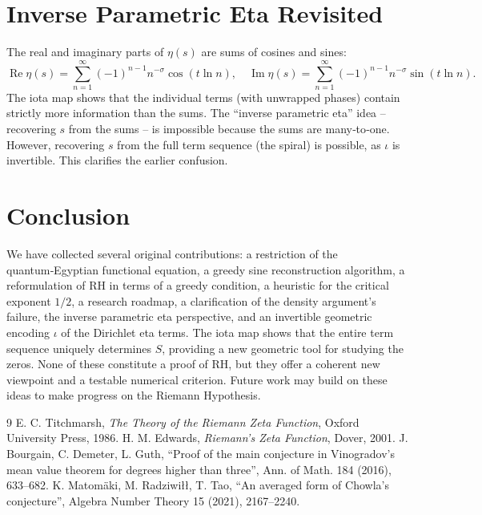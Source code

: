 \documentclass[12pt,a4paper]{article}
\begin{document}
\section{Inverse Parametric Eta Revisited}

The real and imaginary parts of $\eta(s)$ are sums of cosines and sines:
\[
\operatorname{Re}\eta(s)=\sum_{n=1}^\infty (-1)^{n-1}n^{-\sigma}\cos(t\ln n),\quad
\operatorname{Im}\eta(s)=\sum_{n=1}^\infty (-1)^{n-1}n^{-\sigma}\sin(t\ln n).
\]
The iota map shows that the individual terms (with unwrapped phases) contain strictly more information than the sums. The “inverse parametric eta” idea – recovering $s$ from the sums – is impossible because the sums are many‑to‑one. However, recovering $s$ from the full term sequence (the spiral) is possible, as $\iota$ is invertible. This clarifies the earlier confusion.

\section{Conclusion}

We have collected several original contributions: a restriction of the quantum‑Egyptian functional equation, a greedy sine reconstruction algorithm, a reformulation of RH in terms of a greedy condition, a heuristic for the critical exponent $1/2$, a research roadmap, a clarification of the density argument's failure, the inverse parametric eta perspective, and an invertible geometric encoding $\iota$ of the Dirichlet eta terms. The iota map shows that the entire term sequence uniquely determines $S$, providing a new geometric tool for studying the zeros. None of these constitute a proof of RH, but they offer a coherent new viewpoint and a testable numerical criterion. Future work may build on these ideas to make progress on the Riemann Hypothesis.

\begin{thebibliography}{9}
 E. C. Titchmarsh, \textit{The Theory of the Riemann Zeta Function}, Oxford University Press, 1986.
 H. M. Edwards, \textit{Riemann's Zeta Function}, Dover, 2001.
 J. Bourgain, C. Demeter, L. Guth, ``Proof of the main conjecture in Vinogradov's mean value theorem for degrees higher than three'', Ann. of Math. 184 (2016), 633–682.
 K. Matomäki, M. Radziwiłł, T. Tao, ``An averaged form of Chowla's conjecture'', Algebra Number Theory 15 (2021), 2167–2240.
\end{thebibliography}
\end{document}
